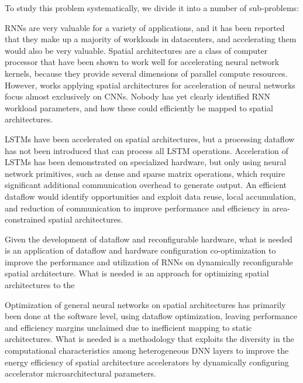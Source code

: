 To study this problem systematically, we divide it into a number of sub-problems:

 RNNs are very valuable for a variety of applications, and it has been reported that they make up a majority of workloads in datacenters, and accelerating them would also be very valuable.
Spatial architectures are a class of computer processor that have been shown to work well for accelerating neural network kernels, because they provide several dimensions of parallel compute resources. 
However, works applying spatial architectures for acceleration of neural networks focus almost exclusively on CNNs.
Nobody has yet clearly identified RNN workload parameters, and how these could efficiently be mapped to spatial architectures.

 LSTMs have been accelerated on spatial architectures, but a processing dataflow has not been introduced that can process all LSTM operations.
Acceleration of LSTMs has been demonstrated on specialized hardware, but only using neural network primitives, such as dense and sparse matrix operations, which require significant additional communication overhead to generate output\cn. 
An efficient dataflow would identify opportunities and exploit data reuse, local accumulation, and reduction of communication to improve performance and efficiency in area-constrained spatial architectures. 

 Given the development of dataflow and reconfigurable hardware, what is needed is an application of dataflow and hardware configuration co-optimization to improve the performance and utilization of RNNs on dynamically reconfigurable spatial architecture. 
What is needed is an approach for optimizing spatial architectures to the 

 Optimization of general neural networks on spatial architectures has primarily been done at the software level, using dataflow optimization, leaving performance and efficiency margins unclaimed due to inefficient mapping to static architectures.
What is needed is a methodology that exploits the diversity in the computational characteristics among heterogeneous DNN layers to improve the energy efficiency of spatial architecture accelerators by dynamically configuring accelerator microarchitectural parameters.

